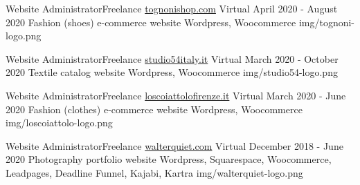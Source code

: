 
\begin{cventries}

  \logocventry
    {Website Administrator{\enskip\cdotp\enskip}Freelance}
    {\href{https://www.tognonishop.com}{tognonishop.com}}
    {Virtual}
    {April 2020 - August 2020}
    {
      \cvexp
        {Fashion (shoes) e-commerce website}
        {}
        {Wordpress, Woocommerce}
    }
    {img/tognoni-logo.png}

  \logocventry
    {Website Administrator{\enskip\cdotp\enskip}Freelance}
    {\href{https://www.studio54italy.it}{studio54italy.it}}
    {Virtual}
    {March 2020 - October 2020}
    {
      \cvexp
        {Textile catalog website}
        {}
        {Wordpress, Woocommerce}
    }
    {img/studio54-logo.png}

  \logocventry
    {Website Administrator{\enskip\cdotp\enskip}Freelance}
    {\href{https://www.loscoiattolofirenze.it}{loscoiattolofirenze.it}}
    {Virtual}
    {March 2020 - June 2020}
    {
      \cvexp
        {Fashion (clothes) e-commerce website}
        {}
        {Wordpress, Woocommerce}
    }
    {img/loscoiattolo-logo.png}

  \logocventry
    {Website Administrator{\enskip\cdotp\enskip}Freelance}
    {\href{https://www.walterquiet.com}{walterquiet.com}}
    {Virtual}
    {December 2018 - June 2020}
    {
      \cvexp
        {Photography portfolio website}
        {}
        {Wordpress, Squarespace, Woocommerce, Leadpages, Deadline Funnel, Kajabi, Kartra}
    }
    {img/walterquiet-logo.png}

\end{cventries}
